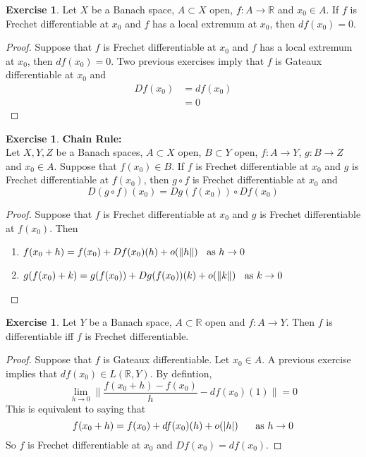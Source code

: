 \documentclass[12pt]{amsart}
\theoremstyle{definition}
\theoremstyle{remark}
\theoremstyle{definition}
\newtheorem{ex}[definition]{Exercise}
\newcommand{\R}{\mathbb{R}}
\begin{document}
	\begin{ex}
	Let $X$ be a Banach space, $A \subset X$ open, $f:A \rightarrow \R$ and $x_0 \in A$. If $f$ is Frechet differentiable at $x_0$ and $f$ has a local extremum at $x_0$, then $df(x_0) = 0$.
	\end{ex}	
	
	\begin{proof}
	Suppose that $f$ is Frechet differentiable at $x_0$ and $f$ has a local extremum at $x_0$, then $df(x_0) = 0$. Two previous exercises imply that $f$ is Gateaux differentiable at $x_0$ and 
	\begin{align*}
	Df(x_0) 
	&= df(x_0) \\
	&= 0
	\end{align*}	
	\end{proof}
	
	
	\begin{ex}\textbf{Chain Rule:}\\
	Let $X, Y, Z$ be a Banach spaces, $A \subset X$ open, $B \subset Y$ open, $f:A \rightarrow Y$, $g:B \rightarrow Z$ and $x_0 \in A$. Suppose that $f(x_0) \in B$. If $f$ is Frechet differentiable at $x_0$ and $g$ is Frechet differentiable at $f(x_0)$, then $g \circ f$ is Frechet differentiable at $x_0$ and $$D(g \circ f)(x_0) = Dg(f(x_0)) \circ Df(x_0)$$
	\end{ex}
	
	\begin{proof}
	Suppose that $f$ is Frechet differentiable at $x_0$ and $g$ is Frechet differentiable at $f(x_0)$. Then 
	\begin{enumerate}
	\item $f(x_0 + h) = f(x_0) + Df(x_0)(h) + o(\|h\|) \hspace{.2cm } \text{ as } h \rightarrow 0 $
	\item $g(f(x_0) + k) = g(f(x_0)) + Dg(f(x_0))(k) + o(\|k\|) \hspace{.2cm } \text{ as } k \rightarrow 0 $
	\end{enumerate}
	\end{proof}
	
	\begin{ex}
	Let $Y$ be a Banach space, $A \subset \R$ open and $f:A \rightarrow Y$. Then $f$ is differentiable iff $f$ is Frechet differentiable.
	\end{ex}
	
	\begin{proof}
	Suppose that $f$ is Gateaux differentiable. Let $x_0 \in A$. A previous exercise implies that $df(x_0) \in L(\R, Y)$. By defintion, $$  \lim_{h \rightarrow 0} \bigg \| \frac{f(x_0 + h) - f(x_0)}{h} - df(x_0)(1) \bigg \| = 0$$ 
	This is equivalent to saying that $$f(x_0 + h) = f(x_0) + df(x_0)(h) + o(|h|) \hspace{.5cm} \text{ as } h \rightarrow 0$$
	So $f$ is Frechet differentiable at $x_0$ and $Df(x_0) = df(x_0)$.
	\end{proof}
	
\end{document}
